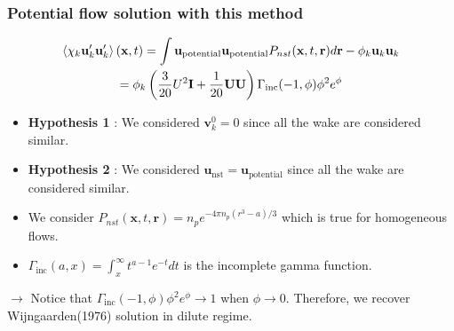 \documentclass{sintefbeamer}
\begin{document}
\begin{frame}
  \frametitle{Potential flow solution with this method}
  \begin{multline*}
    \left<\chi_k \textbf{u}'_k\textbf{u}'_k\right>(\textbf{x},t)
    = 
    {\int \textbf{u}_\text{potential} \textbf{u}_\text{potential}  P_{nst}(\textbf{x},t,\textbf{r}) d\textbf{r} }
    - \phi_k \textbf{u}_k\textbf{u}_k\\
    = \phi_k \left(\frac{3}{20} U^2\textbf{I} + \frac{1}{20}\textbf{UU} \right)
    \Gamma_\text{inc}(-1,\phi)\phi^2 e^\phi
  \end{multline*}

  \begin{itemize}
    \item \textbf{Hypothesis 1} : We considered $\textbf{v}^0_k =0$ since all the wake are considered similar. 
    \item \textbf{Hypothesis 2} : We considered $\textbf{u}_\text{nst} = \textbf{u}_\text{potential}$ since all the wake are considered similar. 
    \item We consider $P_{nst}(\textbf{x},t,\textbf{r}) = n_p e^{-4\pi n_p(r^3-a)/3}$ which is true for homogeneous flows. 
    \item $\Gamma_\text{inc}(a,x) = \int_x^\infty t^{a-1} e^{-t} dt $ is the incomplete gamma  function. 
  \end{itemize}

  $\to$ Notice that $\Gamma_\text{inc}(-1,\phi)\phi^2 e^\phi \rightarrow 1$ when $\phi \rightarrow 0$. Therefore, we recover  Wijngaarden(1976) solution in dilute regime. 
\end{frame}
\end{document}
